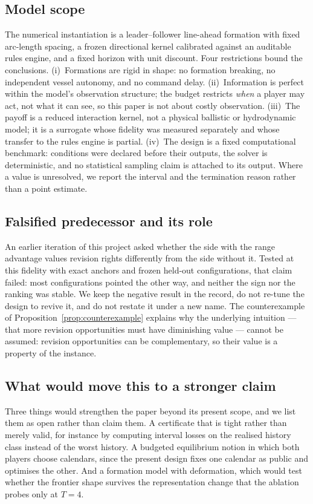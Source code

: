 \subsection{Model scope}

The numerical instantiation is a leader--follower line-ahead formation with
fixed arc-length spacing, a frozen directional kernel calibrated against an
auditable rules engine, and a fixed horizon with unit discount. Four
restrictions bound the conclusions. (i)~Formations are rigid in shape: no
formation breaking, no independent vessel autonomy, and no command delay.
(ii)~Information is perfect within the model's observation structure; the
budget restricts \emph{when} a player may act, not what it can see, so this
paper is not about costly observation. (iii)~The payoff is a reduced
interaction kernel, not a physical ballistic or hydrodynamic model; it is a
surrogate whose fidelity was measured separately and whose transfer to the
rules engine is partial. (iv)~The design is a fixed computational benchmark:
conditions were declared before their outputs, the solver is deterministic,
and no statistical sampling claim is attached to its output. Where a value is
unresolved, we report the interval and the termination reason rather than a
point estimate.

\subsection{Falsified predecessor and its role}

An earlier iteration of this project asked whether the side with the range
advantage values revision rights differently from the side without it. Tested
at this fidelity with exact anchors and frozen held-out configurations, that
claim failed: most configurations pointed the other way, and neither the sign
nor the ranking was stable. We keep the negative result in the record, do not
re-tune the design to revive it, and do not restate it under a new name. The
counterexample of Proposition~\ref{prop:counterexample} explains why the
underlying intuition --- that more revision opportunities must have
diminishing value --- cannot be assumed: revision opportunities can be
complementary, so their value is a property of the instance.

\subsection{What would move this to a stronger claim}

Three things would strengthen the paper beyond its present scope, and we list
them as open rather than claim them. A certificate that is tight rather than
merely valid, for instance by computing interval losses on the realised
history class instead of the worst history. A budgeted equilibrium notion in
which both players choose calendars, since the present design fixes one
calendar as public and optimises the other. And a formation model with
deformation, which would test whether the frontier shape survives the
representation change that the ablation probes only at $T=4$.
